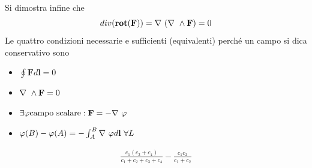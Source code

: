 \documentclass[
10pt, %
a4paper, %
oneside, %
headinclude,footinclude, %
BCOR5mm, %
]{scrartcl}
\begin{document}
Si dimostra infine che 
\[div(\mathbf{rot}(\mathbf{F})) =\mathbf{\nabla\ }(\mathbf{\nabla\ }\wedge\mathbf{F})=0\]
Le quattro condizioni necessarie e sufficienti (equivalenti) perché un campo si dica conservativo sono
\begin{itemize}
	\item \(\oint \mathbf{F}d\mathbf{l} = 0 \)
	\item \(\mathbf{\nabla\ }\wedge\mathbf{F} = 0\)
	\item \(\exists\varphi \text{campo scalare} : \mathbf{F}=-\mathbf{\nabla\ }\varphi\)
	\item \(\varphi(B)-\varphi(A) = -\int_{A}^{B}\mathbf{\nabla\ }\varphi d\mathbf{l}\ \forall L\)
\end{itemize}
\begin{align*}
\frac{c_1(c_2+c_4)}{c_1+c_2+c_3+c_4}-\frac{c_1c_2}{c_1+c_2}
\end{align*}
\end{document}
